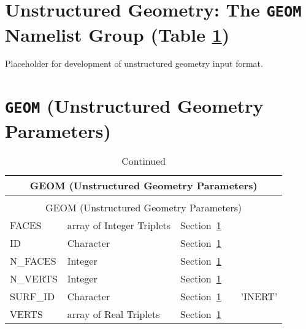\documentclass[12pt]{article}
\begin{document}
\vspace{1.0in}
\section{Unstructured Geometry: The \texorpdfstring{{\tt GEOM}}{GEOM} Namelist Group (Table \ref{tbl:GEOM})}
\label{info:GEOM}

Placeholder for development of unstructured geometry input format.

\vspace{\baselineskip}




\section{\texorpdfstring{{\tt GEOM}}{GEOM} (Unstructured Geometry Parameters)}


\begin{longtable}{@{\extracolsep{\fill}}|l|l|l|l|l|}
\caption[Unstructured geometry parameters ({\ct GEOM} namelist group)]{For more information see Section~\ref{info:GEOM}.}
\label{tbl:GEOM} \\
\hline
\multicolumn{5}{|c|}{{\ct GEOM} (Unstructured Geometry Parameters)} \\
\hline \hline
\endfirsthead
\caption[]{Continued} \\
\hline
\multicolumn{5}{|c|}{{\ct GEOM} (Unstructured Geometry Parameters)} \\
\hline \hline
\endhead
{\ct FACES}        & array of Integer Triplets     & Section~\ref{info:GEOM}            &           &                          \\ \hline
{\ct ID}           & Character                     & Section~\ref{info:GEOM}            &           &                          \\ \hline
{\ct N\_FACES}     & Integer                       & Section~\ref{info:GEOM}            &           &                          \\ \hline
{\ct N\_VERTS}     & Integer                       & Section~\ref{info:GEOM}            &           &                          \\ \hline
{\ct SURF\_ID}     & Character                     & Section~\ref{info:GEOM}            &           &  {\ct 'INERT'}           \\ \hline
{\ct VERTS}        & array of Real Triplets        & Section~\ref{info:GEOM}            &           &                          \\ \hline
\end{longtable}


\vspace{\baselineskip}
\end{document}
